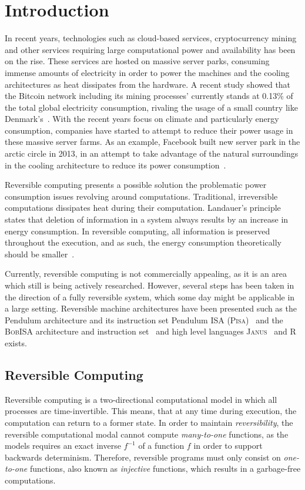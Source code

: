 \chapter{Introduction}
\label{chp:introduction}
In recent years, technologies such as cloud-based services, cryptocurrency mining and other services requiring large computational power and availability has been on the rise. These services are hosted on massive server parks, consuming immense amounts of electricity in order to power the machines and the cooling architectures as heat dissipates from the hardware. A recent study showed that the Bitcoin network including its mining processes' currently stands at 0.13\% of the total global electricity consumption, rivaling the usage of a small country like Denmark's~\cite{digiconomist:bitcoin}. With the recent years focus on climate and particularly energy consumption, companies have started to attempt to reduce their power usage in these massive server farms. As an example, Facebook built new server park in the arctic circle in 2013, in an attempt to take advantage of the natural surroundings in the cooling architecture to reduce its power consumption~\cite{bloomberg:facebook}. 

Reversible computing presents a possible solution the problematic power consumption issues revolving around computations. Traditional, irreversible computations dissipates heat during their computation. Landauer's principle states that deletion of information in a system always results by an increase in energy consumption. In reversible computing, all information is preserved throughout the execution, and as such, the energy consumption theoretically should be smaller~\cite{rl:irreversibility}.

Currently, reversible computing is not commercially appealing, as it is an area which still is being actively researched. However, several steps has been taken in the direction of a fully reversible system, which some day might be applicable in a large setting. Reversible machine architectures have been presented such as the Pendulum architecture and its instruction set Pendulum ISA (\textsc{Pisa})~\cite{cv:pendulum} and the \textsc{BobISA} architecture and instruction set~\cite{mt:bob} and high level languages \textsc{Janus}~\cite{cl:janus, ty:janus, ty:ejanus} and \textsc{R}~\cite{mf:r} exists. 


\section{Reversible Computing}
\label{sec:reversible-computing}
Reversible computing is a two-directional computational model in which all processes are time-invertible. This means, that at any time during execution, the computation can return to a former state. In order to maintain \textit{reversibility}, the reversible computational modal cannot compute \textit{many-to-one} functions, as the models requires an exact inverse $f^{-1}$ of a function $f$ in order to support backwards determinism. Therefore, reversible programs must only consist on \textit{one-to-one} functions, also known as \textit{injective} functions, which results in a garbage-free computations.

